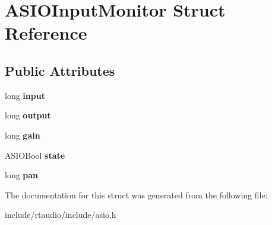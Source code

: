 \hypertarget{struct_a_s_i_o_input_monitor}{}\section{A\+S\+I\+O\+Input\+Monitor Struct Reference}
\label{struct_a_s_i_o_input_monitor}
\subsection*{Public Attributes}
\begin{DoxyCompactItemize}
\item 
long {\bfseries input}\hypertarget{struct_a_s_i_o_input_monitor_a397a6de8c8963afaf3eee4243716f70b}{}\label{struct_a_s_i_o_input_monitor_a397a6de8c8963afaf3eee4243716f70b}

\item 
long {\bfseries output}\hypertarget{struct_a_s_i_o_input_monitor_a142f4d52315c1377df2da6890e7be07b}{}\label{struct_a_s_i_o_input_monitor_a142f4d52315c1377df2da6890e7be07b}

\item 
long {\bfseries gain}\hypertarget{struct_a_s_i_o_input_monitor_a880f98c33636a2ccca4e34c8cf456400}{}\label{struct_a_s_i_o_input_monitor_a880f98c33636a2ccca4e34c8cf456400}

\item 
A\+S\+I\+O\+Bool {\bfseries state}\hypertarget{struct_a_s_i_o_input_monitor_a5fdaeca7c7f534647fddad187542421e}{}\label{struct_a_s_i_o_input_monitor_a5fdaeca7c7f534647fddad187542421e}

\item 
long {\bfseries pan}\hypertarget{struct_a_s_i_o_input_monitor_af5f085f2693b8aecd7c088d04fe72193}{}\label{struct_a_s_i_o_input_monitor_af5f085f2693b8aecd7c088d04fe72193}

\end{DoxyCompactItemize}


The documentation for this struct was generated from the following file\+:\begin{DoxyCompactItemize}
\item 
include/rtaudio/include/asio.\+h\end{DoxyCompactItemize}
